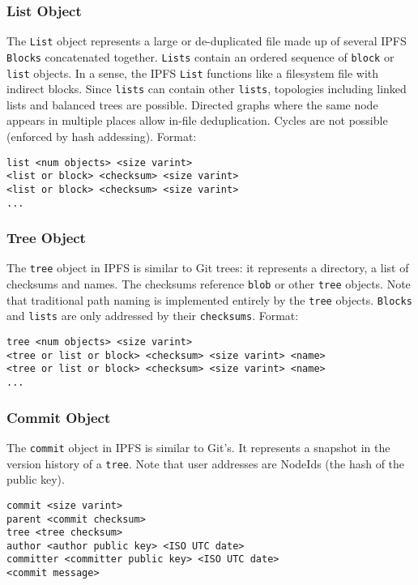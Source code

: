 \documentclass{sig-alternate}
\begin{document}
\subsubsection{List Object}

The \texttt{List} object represents a large or de-duplicated file made up of
several IPFS \texttt{Blocks} concatenated together. \texttt{Lists} contain
an ordered sequence of \texttt{block} or \texttt{list} objects.
In a sense, the IPFS \texttt{List} functions like a filesystem file with
indirect blocks. Since \texttt{lists} can contain other \texttt{lists}, topologies including linked lists and balanced trees are possible. Directed graphs where the same node appears in multiple places allow in-file deduplication. Cycles are not possible (enforced by hash addessing).
Format:
\begin{verbatim}
list <num objects> <size varint>
<list or block> <checksum> <size varint>
<list or block> <checksum> <size varint>
...
\end{verbatim}


\subsubsection{Tree Object}

The \texttt{tree} object in IPFS is similar to Git trees: it represents a
directory, a list of checksums and names. The checksums reference \texttt{blob}
or other \texttt{tree} objects. Note that traditional path naming
is implemented entirely by the \texttt{tree} objects. \texttt{Blocks} and
\texttt{lists} are only addressed by their \texttt{checksums}.
Format:
\begin{verbatim}
tree <num objects> <size varint>
<tree or list or block> <checksum> <size varint> <name>
<tree or list or block> <checksum> <size varint> <name>
...
\end{verbatim}

\subsubsection{Commit Object}

The \texttt{commit} object in IPFS is similar to Git's. It represents a
snapshot in the version history of a \texttt{tree}. Note that user
addresses are NodeIds (the hash of the public key).

\begin{verbatim}
commit <size varint>
parent <commit checksum>
tree <tree checksum>
author <author public key> <ISO UTC date>
committer <committer public key> <ISO UTC date>
<commit message>
\end{verbatim}
\end{document}
